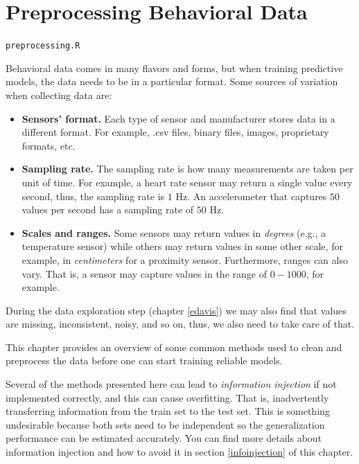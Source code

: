 \documentclass[
  11pt,
]{krantz}
\makeatletter
\newenvironment{kframe}{%
\medskip{}
\setlength{\fboxsep}{.8em}
 \def\at@end@of@kframe{}%
 \ifinner\ifhmode%
  \def\at@end@of@kframe{\end{minipage}}%
  \begin{minipage}{\columnwidth}%
 \fi\fi%
 \def\FrameCommand##1{\hskip\@totalleftmargin \hskip-\fboxsep
 \colorbox{shadecolor}{##1}\hskip-\fboxsep
     \hskip-\linewidth \hskip-\@totalleftmargin \hskip\columnwidth}%
 \MakeFramed {\advance\hsize-\width
   \@totalleftmargin\z@ \linewidth\hsize
   \@setminipage}}%
 {\par\unskip\endMakeFramed%
 \at@end@of@kframe}
\newenvironment{rmdblock}[1]
  {
  \begin{itemize}
  \renewcommand{\labelitemi}{
    \raisebox{-.7\height}[0pt][0pt]{
      {\setkeys{Gin}{width=3em,keepaspectratio}\texttt{[image: images/icons/\#1]}}
    }
  }
  \setlength{\fboxsep}{1em}
  \begin{kframe}
  \item
  }
  {
  \end{kframe}
  \end{itemize}
  }
\newenvironment{rmdcaution}
  {\begin{rmdblock}{caution}}
  {\end{rmdblock}}
\newenvironment{rmdfolder}
  {\begin{rmdblock}{folder}}
  {\end{rmdblock}}
\makeatother
\begin{document}
\hypertarget{preprocessing}{%
\chapter{Preprocessing Behavioral Data}\label{preprocessing}}

\begin{rmdfolder}
\texttt{preprocessing.R}
\end{rmdfolder}

Behavioral data comes in many flavors and forms, but when training predictive models, the data needs to be in a particular format. Some sources of variation when collecting data are:

\begin{itemize}
\item
  \textbf{Sensors' format.} Each type of sensor and manufacturer stores data in a different format. For example, .csv files, binary files, images, proprietary formats, etc.
\item
  \textbf{Sampling rate.} The sampling rate is how many measurements are taken per unit of time. For example, a heart rate sensor may return a single value every second, thus, the sampling rate is \(1\) Hz. An accelerometer that captures \(50\) values per second has a sampling rate of \(50\) Hz.
\item
  \textbf{Scales and ranges.} Some sensors may return values in \emph{degrees} (e.g., a temperature sensor) while others may return values in some other scale, for example, in \emph{centimeters} for a proximity sensor. Furthermore, ranges can also vary. That is, a sensor may capture values in the range of \(0-1000\), for example.
\end{itemize}

During the data exploration step (chapter \ref{edavis}) we may also find that values are missing, inconsistent, noisy, and so on, thus, we also need to take care of that.

This chapter provides an overview of some common methods used to clean and preprocess the data before one can start training reliable models.

\begin{rmdcaution}
Several of the methods presented here can lead to \emph{information injection} if not implemented correctly, and this can cause overfitting. That is, inadvertently transferring information from the train set to the test set. This is something undesirable because both sets need to be independent so the generalization performance can be estimated accurately. You can find more details about information injection and how to avoid it in section \ref{infoinjection} of this chapter.
\end{rmdcaution}
\end{document}
